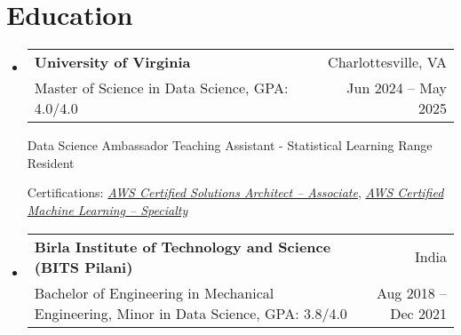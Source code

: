 \documentclass[letterpaper,11pt]{article}
\makeatletter
\newcommand{\resumeSubheading}[4]{
  \item
    \begin{tabular*}{1\textwidth}{l@{\extracolsep{\fill}}r}
      \textbf{\large{#1}} & {\small{#2}} \\
      {{{#3}}} & {{\small{#4}}}
    \end{tabular*}
  \vspace{-0.55cm}
}
\newcommand{\resumeSubHeadingListStart}{\begin{itemize}[leftmargin=0.0in, label={}]}
\newcommand{\resumeSubHeadingListEnd}{\end{itemize}}
\newcommand{\resumeItemListEnd}{\end{itemize}}
\makeatother
\begin{document}

\vspace{-18pt}
\section{\large{Education}}




\resumeSubHeadingListStart


\resumeSubheading
    {University of Virginia}{Charlottesville, VA}
    {Master of Science in Data Science, GPA: 4.0/4.0}{Jun 2024 -- May 2025}

\vspace{5px}
\footnotesize{
Data Science Ambassador {\textbullet}
Teaching Assistant - Statistical Learning {\textbullet}
Range Resident
}



\vspace{-3px}
\small{{Certifications:}
{\href{https://www.credly.com/badges/12da6e0d-aa6a-4a6e-a598-93941c4a35c6}{\textit{AWS Certified Solutions Architect – Associate}}},
{\href{https://www.credly.com/badges/c8b32ca5-03da-4578-a92f-9e11d0011ee8}{\textit{AWS Certified Machine Learning – Specialty}}}}






\resumeSubHeadingListEnd
\vspace{-12pt}

\resumeSubHeadingListStart
\resumeSubheading
    {Birla Institute of Technology and Science \normalsize{(BITS Pilani)}}{India}
    {Bachelor of Engineering in Mechanical Engineering, Minor in Data Science, GPA: 3.8/4.0}{Aug 2018 -- Dec 2021}

\resumeSubHeadingListEnd


\end{document}
